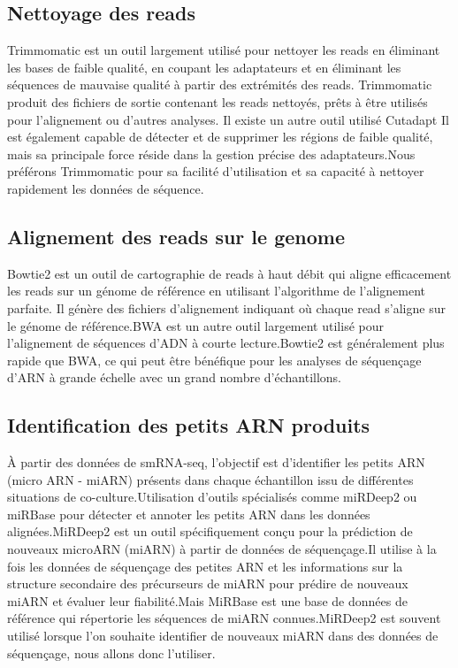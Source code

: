 \documentclass{report}
\begin{document}
\subsection{Nettoyage des reads}
Trimmomatic \cite{trimmomatic}  est un outil largement utilisé pour nettoyer les reads en éliminant les bases de faible qualité, en coupant les adaptateurs et en éliminant les séquences de mauvaise qualité à partir des extrémités des reads.
 Trimmomatic produit des fichiers de sortie contenant les reads nettoyés, prêts à être utilisés pour l'alignement ou d'autres analyses. Il existe un autre outil utilisé Cutadapt \cite{martin2011cutadapt}  Il est également capable de détecter et de supprimer les régions de faible qualité, mais sa principale force réside dans la gestion précise des adaptateurs.Nous préférons Trimmomatic pour sa facilité d'utilisation et sa capacité à nettoyer rapidement les données de séquence.
 

\subsection{Alignement des reads sur le genome}
Bowtie2 \cite{bowtie2} est un outil de cartographie de reads à haut débit qui aligne efficacement les reads sur un génome de référence en utilisant l'algorithme de l'alignement parfaite. Il génère des fichiers d'alignement indiquant où chaque read s'aligne sur le génome de référence.BWA \cite{li2009fast} est un autre outil largement utilisé pour l'alignement de séquences d'ADN à courte lecture.Bowtie2 est généralement plus rapide que BWA, ce qui peut être bénéfique pour les analyses de séquençage d'ARN à grande échelle avec un grand nombre d'échantillons.

\subsection{Identification des petits ARN produits }
À partir des données de smRNA-seq, l'objectif est d'identifier les petits ARN (micro ARN - miARN) présents dans chaque échantillon issu de différentes situations de co-culture.Utilisation d'outils spécialisés comme miRDeep2 \cite{friedlander2012discover} ou miRBase \cite{kozomara2019mirbase} pour détecter et annoter les petits ARN dans les données alignées.MiRDeep2 est un outil spécifiquement conçu pour la prédiction de nouveaux microARN (miARN) à partir de données de séquençage.Il utilise à la fois les données de séquençage des petites ARN et les informations sur la structure secondaire des précurseurs de miARN pour prédire de nouveaux miARN et évaluer leur fiabilité.Mais MiRBase est une base de données de référence qui répertorie les séquences de miARN connues.MiRDeep2 est souvent utilisé lorsque l'on souhaite identifier de nouveaux miARN dans des données de séquençage, nous allons donc l'utiliser.
\end{document}
